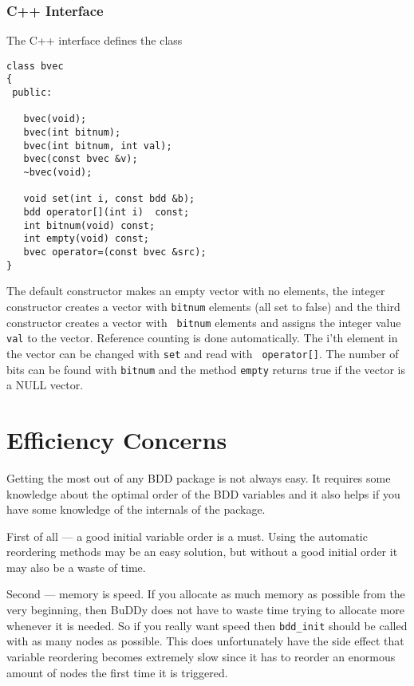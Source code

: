 \documentclass[a4paper,11pt,twoside,fleqn,openright]{report}
\begin{document}
\subsection{C++ Interface}

The C++ interface defines the class
\begin{verbatim}
class bvec
{
 public:

   bvec(void);
   bvec(int bitnum);
   bvec(int bitnum, int val);
   bvec(const bvec &v);
   ~bvec(void);

   void set(int i, const bdd &b);
   bdd operator[](int i)  const;
   int bitnum(void) const;
   int empty(void) const;
   bvec operator=(const bvec &src);
}   
\end{verbatim}

\noindent
The default constructor makes an empty vector with no elements, the
integer constructor creates a vector with {\tt bitnum} elements (all
set to false) and the third constructor creates a vector with {\tt
  bitnum} elements and assigns the integer value {\tt val} to the
vector. Reference counting is done automatically. The i'th element in
the vector can be changed with {\tt set} and read with {\tt
  operator[]}. The number of bits can be found with {\tt bitnum} and
the method {\tt empty} returns true if the vector is a NULL vector.

  
\chapter{Efficiency Concerns}

Getting the most out of any BDD package is not always easy. It
requires some knowledge about the optimal order of the BDD variables
and it also helps if you have some knowledge of the internals of the
package.

First of all --- a good initial variable order is a must. Using the
automatic reordering methods may be an easy solution, but without a
good initial order it may also be a waste of time.

Second --- memory is speed. If you allocate as much memory as possible
from the very beginning, then BuDDy does not have to waste time trying to
allocate more whenever it is needed. So if you really want speed then
{\tt bdd\_init} should be called with as many nodes as possible. This
does unfortunately have the side effect that variable reordering
becomes extremely slow since it has to reorder an enormous amount of
nodes the first time it is triggered.
\end{document}
